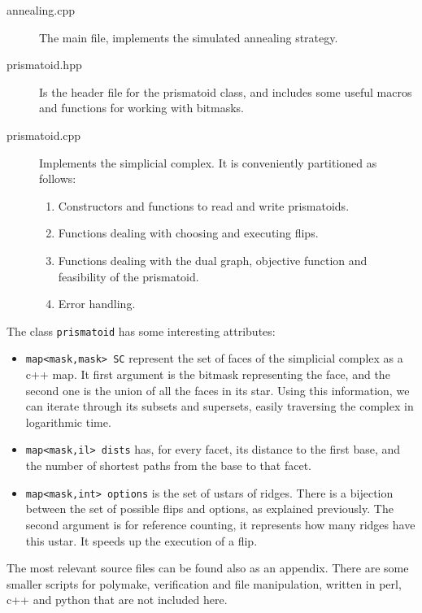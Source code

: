 \documentclass[12pt,a4paper]{article}
\theoremstyle{plain}
\theoremstyle{definition}
\begin{document}
\begin{description}
  \item[annealing.cpp] The main file, implements the simulated annealing strategy.
  \item[prismatoid.hpp] Is the header file for the prismatoid class, and includes some useful macros and functions for working with bitmasks.
  \item[prismatoid.cpp] Implements the simplicial complex. It is conveniently partitioned as follows:
    \begin{enumerate}
      \item Constructors and functions to read and write prismatoids.
      \item Functions dealing with choosing and executing flips.
      \item Functions dealing with the dual graph, objective function and feasibility of the prismatoid.
      \item Error handling.
    \end{enumerate}
\end{description}

The class \lstinline{prismatoid} has some interesting attributes:

\begin{itemize}
  \item \lstinline{map<mask,mask> SC} represent the set of faces of the simplicial complex as a c++ map. It first argument is the bitmask representing the face, and the second one is the union of all the faces in its star. Using this information, we can iterate through its subsets and supersets, easily traversing the complex in logarithmic time.
  \item \lstinline{map<mask,il> dists} has, for every facet, its distance to the first base, and the number of shortest paths from the base to that facet.

  \item \lstinline{map<mask,int> options} is the set of ustars of ridges. There is a bijection between the set of possible flips and options, as explained previously. The second argument is for reference counting, it represents how many ridges have this ustar. It speeds up the execution of a flip.
\end{itemize}

The most relevant source files can be found also as an appendix. There are some smaller scripts for polymake, verification and file manipulation, written in perl, c++ and python that are not included here.
\end{document}
